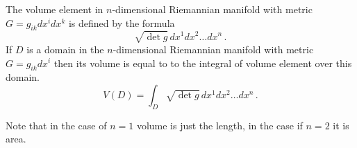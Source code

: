 \documentclass[12pt]{article}
\theoremstyle{theorem}
\numberwithin{equation}{section}
\begin{document}


   The volume element
in $n$-dimensional Riemannian manifold with metric $G=g_{ik}dx^i
    dx^k$ is defined by the formula
     \begin{equation}\label{volumelement}
  \sqrt {\det g}\,dx^1dx^2\dots dx^n\,.
\end{equation}
    If $D$ is a domain in the $n$-dimensional Riemannian manifold with metric
    $G=g_{ik}dx^i$
    then its volume is equal to to the integral of volume element over this domain.
          \begin{equation}\label{volumeofriemannianmanifold}
  V(D)=\int_D \sqrt {\det g}\,dx^1dx^2\dots dx^n\,.
\end{equation}


     Note that in the case of $n=1$ volume is just the length, in the case
     if $n=2$ it is area.
\end{document}
